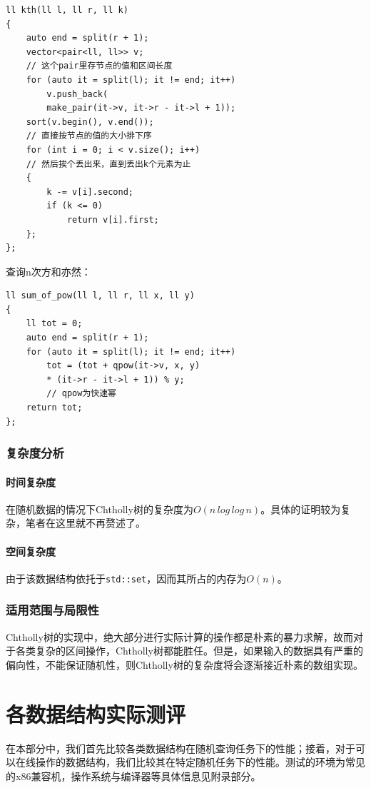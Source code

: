 \documentclass{cjc}
\begin{document}
\begin{lstlisting}
ll kth(ll l, ll r, ll k)
{
    auto end = split(r + 1);
    vector<pair<ll, ll>> v; 
    // 这个pair里存节点的值和区间长度
    for (auto it = split(l); it != end; it++)
        v.push_back(
        make_pair(it->v, it->r - it->l + 1));
    sort(v.begin(), v.end()); 
    // 直接按节点的值的大小排下序
    for (int i = 0; i < v.size(); i++) 
    // 然后挨个丢出来，直到丢出k个元素为止
    {
        k -= v[i].second;
        if (k <= 0)
            return v[i].first;
    };
};
\end{lstlisting}
查询n次方和亦然：
\begin{lstlisting}
ll sum_of_pow(ll l, ll r, ll x, ll y)
{
    ll tot = 0;
    auto end = split(r + 1);
    for (auto it = split(l); it != end; it++)
        tot = (tot + qpow(it->v, x, y) 
        * (it->r - it->l + 1)) % y; 
        // qpow为快速幂
    return tot;
};
\end{lstlisting}

\subsubsection{复杂度分析}
\paragraph{时间复杂度} 在随机数据的情况下Chtholly树的复杂度为$O(n\,log\,log\,n)$。具体的证明较为复杂，笔者在这里就不再赘述了。
\paragraph{空间复杂度} 由于该数据结构依托于\lstinline{std::set}，因而其所占的内存为$O(n)$。
\subsubsection{适用范围与局限性}
Chtholly树的实现中，绝大部分进行实际计算的操作都是朴素的暴力求解，故而对于各类复杂的区间操作，Chtholly树都能胜任。但是，如果输入的数据具有严重的偏向性，不能保证随机性，则Chtholly树的复杂度将会逐渐接近朴素的数组实现。

\section{各数据结构实际测评}

在本部分中，我们首先比较各类数据结构在随机查询任务下的性能；接着，对于可以在线操作的数据结构，我们比较其在特定随机任务下的性能。测试的环境为常见的x86兼容机，操作系统与编译器等具体信息见附录部分。
\end{document}
